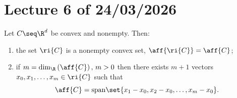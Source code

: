 \chapter{Lecture 6 of 24/03/2026}

\begin{proposition}

    Let $C \seq \R^d$ be convex and nonempty. Then: 

    \begin{enumerate}
        \item[a)] the set $\ri{C}$ is a nonempty convex set, $\aff{\ri{C}} = \aff{C}$;
        \item[b)] if $m = \mathrm{dim}_\R \left(\aff{C}\right), \, m>0$ then there exists $m+1$ vectors $x_0,x_1,\dots,x_m \in \ri{C}$ such that 
            \[ \aff{C} = \mathrm{span}\set{x_1 - x_0, x_2 - x_0, \dots, x_m - x_{0}}. \]
    \end{enumerate}
    
\end{proposition}

